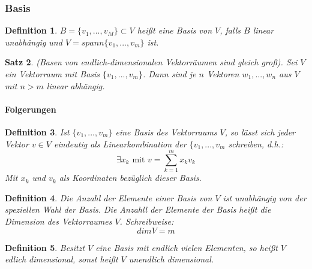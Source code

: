 \documentclass[12pt,a4paper]{article}%
\newtheorem{satz}{Satz}[section]
\newtheorem{definition}[satz]{Definition}
\numberwithin{equation}{section}
\newcommand{\subsubsubsection}{\paragraph}
\def\mDef#1{
\begin{definition}
  #1
\end{definition}}
\numberwithin{equation}{subsection}
\begin{document}
	  \subsubsection{Basis}
	  \begin{definition}
	    $B = \lbrace v_1,...,v_M\rbrace \subset V$ heißt eine Basis von $V$, falls $B$ linear unabhängig und $V = spann \lbrace v_1,...,v_m \rbrace$ ist.
	  \end{definition}
	 
    \begin{satz}
      \glqq (Basen von endlich-dimensionalen Vektorräumen sind gleich groß).\newline
      Sei $V$ ein Vektorraum mit Basis $\lbrace v_1,...,v_m\rbrace$. Dann sind je $n$ Vektoren $w_1,...,w_n$ aus $V$ mit $n>m$ linear abhängig. \grqq \cite{HM12}
    \end{satz}
     
     \subsubsubsection{Folgerungen}
     \begin{definition}
		  \glqq Ist $\lbrace v_1,...,v_m \rbrace$ eine Basis des Vektorraums $V$, so lässt sich jeder Vektor $v \in V$ eindeutig als Linearkombination der $\lbrace               
		    v_1,...,v_m$ schreiben, d.h.:
		    \begin{equation}
		      \exists x_k \text{ mit } v = \sum_{k=1}^m x_k v_k
		    \end{equation}
		    \grqq \cite{HM12}\newline
		    Mit $x_k$ und $v_k$ als Koordinaten bezüglich dieser Basis.
	    \end{definition}
	    
	    \begin{definition}
		    \glqq Die Anzahl der Elemente einer Basis von $V$ ist unabhängig von der speziellen Wahl der Basis. Die Anzahll der Elemente der Basis heißt die Dimension des Vektorraumes $V$.\grqq \cite{HM12} Schreibweise:
		    \begin{equation}
		      dim V = m
		    \end{equation}
		   \end{definition}
		   
		   \mDef{
		     \glqq Besitzt $V$ eine Basis mit endlich vielen Elementen, so heißt $V$ edlich dimensional, sonst heißt $V$ unendlich dimensional. \grqq \cite{HM12}
		   }
	    
\end{document}
